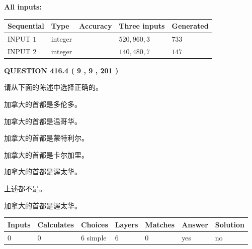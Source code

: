\documentclass{ctexart}
\begin{document}
   
   
   
\noindent\vspace{0.1in}\hspace{-0.08in} {\textbf{\Large{All inputs: }}}
   
   
  
  
\noindent\begin{tabular}{|l|l|l|l|l|}
\hline
 Sequential & Type & Accuracy & Three inputs & Generated \\ 
\hline
 
 
  INPUT $  1 $ & integer &  & $
 520
 , 
 960
 , 
 3
 $ & $ 733 $ 
 \\  \hline  
 
 
  INPUT $  2 $ & integer &  & $
 140
 , 
 480
 , 
 7
 $ & $ 147 $ 
 \\  \hline  
 \end{tabular}
   
   
  
\vspace{0.2in}
  
{\textbf{\Large{QUESTION
416.4 
 ( 9 , 9 , 201 )
}}}
  
  
请从下面的陈述中选择正确的。
 
 
加拿大的首都是多伦多。
 
 
加拿大的首都是温哥华。
 
 
加拿大的首都是蒙特利尔。
 
 
加拿大的首都是卡尔加里。
 
 
加拿大的首都是渥太华。
 
 
 上述都不是。
 
 
\noindent{}
 
 
加拿大的首都是渥太华。
 
 
\noindent{}
 
 
   
   
   
   
\noindent\begin{tabular}{|l|l|l|l|l|l|l|}
 \hline
Inputs & Calculates & Choices & Layers & Matches & Answer & Solution \\ \hline
 0  & 
 0  & 
 6
  simple  
  & 
 6  & 
 0  & 
  yes & 
  no 
  \\ \hline
 \end{tabular}
   
\end{document}
